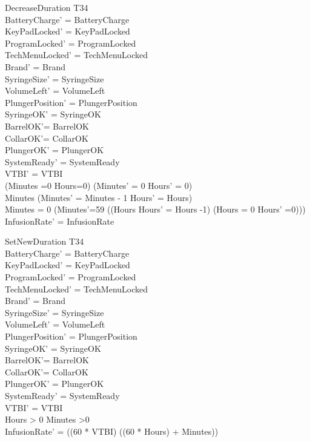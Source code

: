 \documentclass[landscape]{article}
\begin{document}
\begin{schema} {DecreaseDuration}
\Delta T34\\
\where
BatteryCharge' =  BatteryCharge \\
KeyPadLocked' = KeyPadLocked\\
ProgramLocked' = ProgramLocked \\
TechMenuLocked' = TechMenuLocked\\
Brand' = Brand\\ 
SyringeSize' = SyringeSize\\
VolumeLeft' = VolumeLeft\\
PlungerPosition' = PlungerPosition \\
SyringeOK' = SyringeOK\\
BarrelOK'= BarrelOK\\
CollarOK'= CollarOK\\
PlungerOK' = PlungerOK \\
SystemReady' = SystemReady\\
VTBI' = VTBI\\ 
(Minutes =0 \land Hours=0) \implies (Minutes' = 0 \land Hours' = 0)\\
Minutes  \implies (Minutes' = Minutes - 1 \land Hours' = Hours)\\
Minutes = 0 \implies (Minutes'=59 \land ((Hours  \implies Hours' = Hours -1) \land (Hours = 0 \implies Hours' =0)))\\
InfusionRate' = InfusionRate\\
\end{schema}

\begin{schema} {SetNewDuration}
\Delta T34\\
\where
BatteryCharge' =  BatteryCharge \\
KeyPadLocked' = KeyPadLocked\\
ProgramLocked' = ProgramLocked \\
TechMenuLocked' = TechMenuLocked\\
Brand' = Brand\\ 
SyringeSize' = SyringeSize\\
VolumeLeft' = VolumeLeft\\
PlungerPosition' = PlungerPosition \\
SyringeOK' = SyringeOK\\
BarrelOK'= BarrelOK\\
CollarOK'= CollarOK\\
PlungerOK' = PlungerOK \\
SystemReady' = SystemReady\\
VTBI' = VTBI\\ 
Hours > 0 \lor Minutes >0\\
InfusionRate' = ((60 * VTBI) \div ((60 * Hours) + Minutes))\\
\end{schema}
\end{document}
